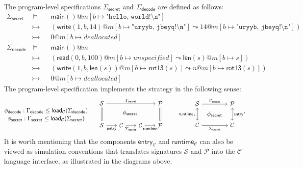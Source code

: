 \documentclass[acmsmall,screen,review,anonymous,nonacm]{acmart}
\newcommand{\kw}[1]{\ensuremath{ \mathsf{#1} }}
\begin{document}
The
program-level specifications
$\Sigma_\kw{secret}$ and $\Sigma_\kw{decode}$
are defined as follows:
{\small
\begin{align*}
  \Sigma_\kw{secret} & \:\vDash\: &&
  \kw{main()}@m[b \mapsto \texttt{"hello, world!\textbackslash{}n"}] \\
  & \rightarrowtail &&
    (\kw{write}(1, b, 14)@m [b \mapsto \texttt{"uryyb, jbeyq!\textbackslash{}n"}]
   \leadsto 14@m[b \mapsto \texttt{"uryyb, jbeyq!\textbackslash{}n"}]) \\
  & \rightarrowtail && 0@m[b \mapsto deallocated] \\
  \Sigma_\kw{decode} & \:\vDash\ &&
  \kw{main()}@m \\
  & \rightarrowtail && ( \kw{read}(0, b, 100)@m[b \mapsto unspecified]
   \leadsto \kw{len}(s)@m[b \mapsto s]) \\
  & \rightarrowtail && (\kw{write}(1, b, \kw{len}(s))@m[b\mapsto \kw{rot13}(s)]
   \leadsto n@m[b\mapsto \kw{rot13}(s)]) \\
  & \rightarrowtail && 0@m[b \mapsto deallocated]
\end{align*}}
The program-level specification
implements the strategy
in the following sense:
{\small
\[
  \begin{prooftree}
    \hypo{\phi_\kw{decode}: \Gamma_\kw{decode} \le \kw{load}_\mathcal{C}(\Sigma_\kw{decode})}
    \infer[no rule]1
    {\phi_\kw{secret}: \Gamma_\kw{secret} \le \kw{load}_\mathcal{C}(\Sigma_\kw{secret})}
  \end{prooftree}
  \quad
  \begin{array}{c}
    \begin{tikzcd}[row sep=2.5ex, column sep=4ex]
      \mathcal{S} \ar[dd, equal]
      \ar[rrr, "\Gamma_\kw{secret}"]
       &&&
      \mathcal{P} \ar[dd, equal] \\
      & &|[xshift=-4ex, overlay]| \phi_\kw{secret} & \\
      \mathcal{S} \ar[r, "\kw{entry}"'] & \mathcal{C} \ar[r, "\Sigma_\kw{secret}"'] & \mathcal{C}\ar[r, "\kw{runtime}"']  & \mathcal{P}
    \end{tikzcd}
  \end{array}
  \quad
  \begin{array}{c}
    \begin{tikzcd}[row sep=0.5ex, column sep=1ex]
      \mathcal{S} \ar[dd, leftrightarrow, "\kw{runtime}_*"']
	  \ar[rr, "\Gamma_\kw{secret}"] &&
      \mathcal{P} \ar[dd, leftrightarrow, "\kw{entry}^*"] \\
      & \phi_\kw{secret} & \\
      \mathcal{C} \ar[rr, "\Sigma_\kw{secret}"'] &&
      \mathcal{C}
    \end{tikzcd}
  \end{array}
\]}%
It is worth mentioning that
the components $\kw{entry}_\mathcal{C}$ and $\kw{runtime}_\mathcal{C}$
can also be viewed as simulation conventions
that translates signatures $\mathcal{S}$ and $\mathcal{P}$
into the $\mathcal{C}$ language interface,
as illustrated in the diagrams above.
\end{document}
